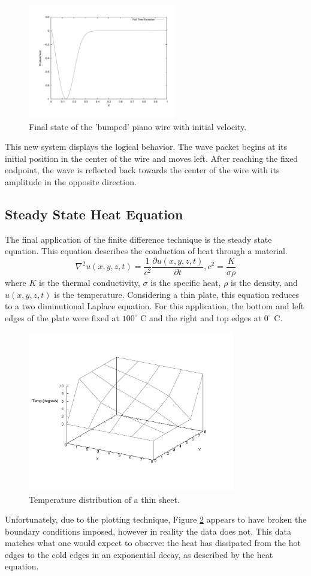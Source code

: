 \documentclass[12pt]{article}
\begin{document}
\begin{figure}[!h]
\centering
\includegraphics[width =110 mm, height = 50mm]{Ex_7_3_100.pdf}
\caption{Final state of the 'bumped' piano wire with initial velocity.}
\label{fig:7_3_100}
\end{figure}
This new system displays the logical behavior.  The wave packet begins at its initial position in the center of the wire and moves left.  After reaching the fixed endpoint, the wave is reflected back towards the center of the wire with its amplitude in the opposite direction.
\pagebreak
\subsection{Steady State Heat Equation}
The final application of the finite difference technique is the steady state equation.  This equation describes the conduction of heat through a material.  
\begin{equation}
\label{heat}
\nabla^2u(x,y,z,t)= \frac{1}{c^2}\frac{\partial u(x,y,z,t)}{\partial t}, c^2 = \frac{K}{\sigma \rho}
\end{equation}
where $K$ is the thermal conductivity, $\sigma$ is the specific heat, $\rho$ is the density, and $u(x,y,z,t)$ is the temperature.  Considering a thin plate, this equation reduces to a two diminutional Laplace equation.  For this application, the bottom and left edges of the plate were fixed at $100^\circ$ C and the right and top edges at $0^\circ$ C.
\begin{figure}[!h]
\centering
\includegraphics[width =110 mm, height = 70mm]{Ex_7_8.pdf}
\caption{Temperature distribution of a thin sheet.}
\label{fig:7_8}
\end{figure}

Unfortunately, due to the plotting technique, Figure \ref{fig:7_8} appears to have broken the boundary conditions imposed, however in reality the data does not.  This data matches what one would expect to observe:  the heat has dissipated from the hot edges to the cold edges in an exponential decay, as described by the heat equation.
\end{document}
